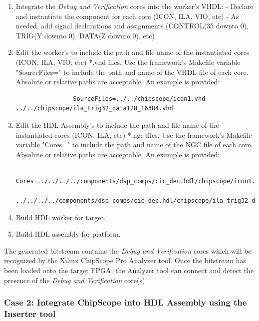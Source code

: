 \begin{flushleft}
		\begin{enumerate}
			\item Integrate the \textit{Debug and Verification} cores into the worker's VHDL:
				\subitem - Declare and instantiate the component for each core (ICON, ILA, VIO, etc)
				\subitem - As needed, add signal declarations and assignments (CONTROL(35 downto 0), TRIG(Y downto 0), DATA(Z downto 0), etc)
			\item Edit the worker's  to include the path and file name of the
			instantiated cores (ICON, ILA, VIO, etc) *.vhd files. Use the framework's Makefile
			variable "SourceFiles=" to include the path and	name of the VHDL file of each core.
			Absolute or relative paths are acceptable. An example is provided:
			\small\begin{verbatim}
				SourceFiles=../../chipscope/icon1.vhd ../../chipscope/ila_trig32_data128_16384.vhd
			\end{verbatim}
		 	\item Edit the HDL Assembly's  to include the path and file name of
		 	the	instantiated cores (ICON, ILA, etc) *.ngc files. Use the framework's
		 	Makefile variable "Cores=" to include the path and name of the NGC file of each
		 	core. Absolute or relative paths are acceptable. An example is provided:
		 	\small\begin{verbatim}
		 		Cores=../../../../components/dsp_comps/cic_dec.hdl/chipscope/icon1.ngc
		 		../../../../components/dsp_comps/cic_dec.hdl/chipscope/ila_trig32_data128_16384.ngc
		 	\end{verbatim}
		 	\item Build HDL worker for target.
			\item Build HDL assembly for platform.
		\end{enumerate}

		The generated bitstream contains the \textit{Debug and Verification} cores which will be recognized by the Xilinx ChipScope Pro Analyzer tool. Once the bitstream has been loaded onto the target FPGA, the Analyzer tool can connect and detect the presence of the \textit{Debug and Verification} core(s).

	\newpage

	\subsubsection{Case 2: Integrate ChipScope into HDL Assembly using the Inserter tool}


\end{flushleft}

